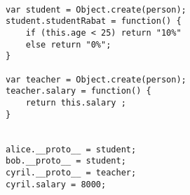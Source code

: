 \begin{verbatim}

var student = Object.create(person);
student.studentRabat = function() {
    if (this.age < 25) return "10%" 
    else return "0%";
}

var teacher = Object.create(person);
teacher.salary = function() {
    return this.salary ;
}


alice.__proto__ = student;
bob.__proto__ = student;
cyril.__proto__ = teacher;
cyril.salary = 8000;
\end{verbatim}
